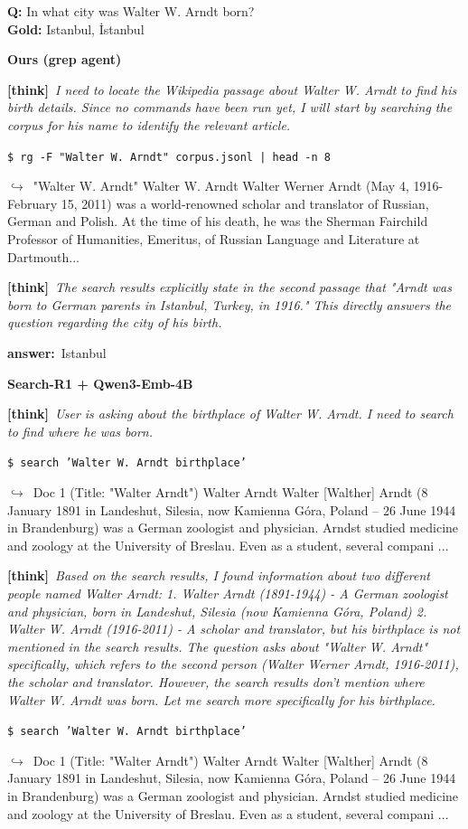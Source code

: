 \documentclass{article} %
\newcommand{\cmark}{\textcolor{green!45!black}{\ding{51}}}
\newcommand{\xmark}{\textcolor{red!60!black}{\ding{55}}}
\newcommand{\winbadge}{\colorbox{green!50!black}{\textcolor{white}{\scriptsize\bfseries\,WIN\,}}}
\newcommand{\thk}[1]{{\footnotesize\textcolor{violet!75!black}{\textbf{[think]}}\ \textit{#1}\par}}
\newcommand{\cmd}[1]{{\footnotesize\texttt{\textcolor{blue!35!black}{\$\ #1}}\par}}
\newcommand{\retr}[1]{{\footnotesize\textcolor{black!65}{\quad$\hookrightarrow$\ #1}\par}}
\newcommand{\ans}[1]{{\footnotesize\textbf{answer:}\ #1\par}}
\begin{document}
\begin{cmpbox}[label={ex:popqa-arndt},title={\winbadge\ \ \textsc{PopQA -- exact name beats semantic blur}}]
\textbf{Q:} In what city was Walter W. Arndt born?\\[1pt]
\textbf{Gold:} Istanbul, İstanbul\par\smallskip
\textbf{Ours (grep agent)}~\cmark\par
  \thk{I need to locate the Wikipedia passage about Walter W. Arndt to find his birth details. Since no commands have been run yet, I will start by searching the corpus for his name to identify the relevant article.}
  \cmd{rg -F "Walter W. Arndt" corpus.jsonl | head -n 8}
  \retr{"Walter W. Arndt" Walter W. Arndt Walter Werner Arndt (May 4, 1916-February 15, 2011) was a world-renowned scholar and translator of Russian, German and Polish. At the time of his death, he was the Sherman Fairchild Professor of Humanities, Emeritus, of Russian Language and Literature at Dartmouth...}
  \thk{The search results explicitly state in the second passage that "Arndt was born to German parents in Istanbul, Turkey, in 1916." This directly answers the question regarding the city of his birth.}
  \ans{Istanbul}
\smallskip\par\textbf{Search-R1 + Qwen3-Emb-4B}~\xmark\par
  \thk{User is asking about the birthplace of Walter W. Arndt. I need to search to find where he was born.}
  \cmd{search 'Walter W. Arndt birthplace'}
  \retr{Doc 1 (Title: "Walter Arndt") Walter Arndt Walter [Walther] Arndt (8 January 1891 in Landeshut, Silesia, now Kamienna Góra, Poland – 26 June 1944 in Brandenburg) was a German zoologist and physician. Arndst studied medicine and zoology at the University of Breslau. Even as a student, several compani ...}
  \thk{Based on the search results, I found information about two different people named Walter Arndt: 1. Walter Arndt (1891-1944) - A German zoologist and physician, born in Landeshut, Silesia (now Kamienna Góra, Poland) 2. Walter W. Arndt (1916-2011) - A scholar and translator, but his birthplace is not mentioned in the search results. The question asks about "Walter W. Arndt" specifically, which refers to the second person (Walter Werner Arndt, 1916-2011), the scholar and translator. However, the search results don't mention where Walter W. Arndt was born. Let me search more specifically for his birthplace.}
  \cmd{search 'Walter W. Arndt birthplace'}
  \retr{Doc 1 (Title: "Walter Arndt") Walter Arndt Walter [Walther] Arndt (8 January 1891 in Landeshut, Silesia, now Kamienna Góra, Poland – 26 June 1944 in Brandenburg) was a German zoologist and physician. Arndst studied medicine and zoology at the University of Breslau. Even as a student, several compani ...}

\end{cmpbox}
\end{document}
